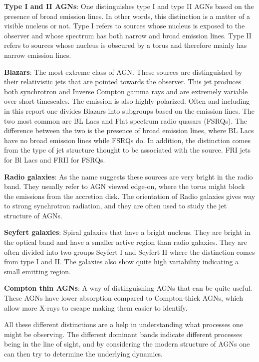 \textbf{Type I and II AGNs}:
One distinguishes type I and type II AGNs based on the presence of broad emission lines. In other words, this distinction is
a matter of a visible nucleus or not. Type I refers to sources whose nucleus is exposed to the observer and whose spectrum
has both narrow and broad emission lines. Type II refers to sources whose nucleus is obscured by a torus and therefore mainly has narrow emission lines.

\textbf{Blazars}:
The most extreme class of AGN. These sources are distinguished by their relativistic jets that are pointed towards the observer. 
This jet produces both synchrotron and Inverse Compton gamma rays and are extremely variable over short timescales. The
emission is also highly polarized. Often and including in this report one divides Blazars into subgroups based on the 
emission lines. The two most common are BL Lacs and Flat spectrum radio quasars (FSRQs). The difference between the two is the
presence of broad emission lines, where BL Lacs have no broad emission lines while FSRQs do. 
In addition, the distinction comes from the type of jet structure thought to be associated with the source. FRI jets for Bl Lacs and FRII for FSRQs. 

\textbf{Radio galaxies}:
As the name suggests these sources are very bright in the radio band. They usually refer to AGN viewed edge-on, where the
torus might block the emissions from the accretion disk. The orientation of Radio galaxies gives way to strong 
synchrotron radiation, and they are often used to study the jet structure of AGNs.

\textbf{Seyfert galaxies}:
Spiral galaxies that have a bright nucleus. They are bright in the optical band and have a smaller active region 
than radio galaxies. They are often divided into two groups Seyfert I and Seyfert II where the distinction comes from type I and II. 
The galaxies also show quite high variability indicating a small emitting region. 

\textbf{Compton thin AGNs}: 
A way of distinguishing AGNs that can be quite useful. These AGNs have lower absorption compared to Compton-thick AGNs, which allow more X-rays to escape making them easier to identify. 



All these different distinctions are a help in understanding what processes one might be observing. The different
dominant bands indicate different processes being in the line of sight, and by considering the modern structure of 
AGNs one can then try to determine the underlying dynamics.  

 
